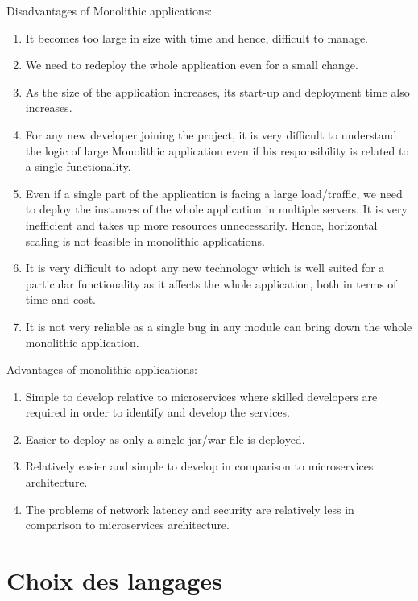 Disadvantages of Monolithic applications:
\begin{enumerate}
      \item
            It becomes too large in size with time and hence, difficult to manage.
      \item
            We need to redeploy the whole application even for a small change.
      \item
            As the size of the application increases, its start-up and deployment time also increases.
      \item
            For any new developer joining the project, it is very difficult to understand the logic of large Monolithic application even if his responsibility is related to a single functionality.
      \item
            Even if a single part of the application is facing a large load/traffic, we need to deploy the instances of the whole application in multiple servers. It is very inefficient and takes up more resources unnecessarily. Hence, horizontal scaling is not feasible in monolithic applications.
      \item
            It is very difficult to adopt any new technology which is well suited for a particular functionality as it affects the whole application, both in terms of time and cost.
      \item
            It is not very reliable as a single bug in any module can bring down the whole monolithic application.
\end{enumerate}
Advantages of monolithic applications:
\begin{enumerate}
      \item
            Simple to develop relative to microservices where skilled developers are required in order to identify and develop the services.
      \item
            Easier to deploy as only a single jar/war file is deployed.
      \item
            Relatively easier and simple to develop in comparison to microservices architecture.
      \item
            The problems of network latency and security are relatively less in comparison to microservices architecture.
\end{enumerate}


\section{Choix des langages}

